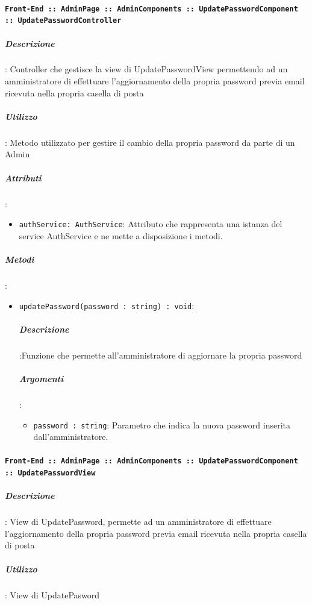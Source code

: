 \documentclass[../DefinizioneDiProdotto_v3.0.0.tex]{subfiles}
\begin{document}
				\paragraph{\texttt{Front-End :: AdminPage :: AdminComponents :: UpdatePasswordComponent :: UpdatePasswordController}}
					\subparagraph{Descrizione}: Controller che gestisce la view di UpdatePasswordView permettendo ad un amministratore di effettuare l'aggiornamento della propria password previa email ricevuta nella propria casella di posta
					\subparagraph{Utilizzo}: Metodo utilizzato per gestire il cambio della propria password da parte di un Admin
					\subparagraph{Attributi}:
					\begin{itemize}
						\item \texttt{authService: AuthService}: Attributo che rappresenta una istanza del service AuthService e ne mette a disposizione i metodi.
					\end{itemize}
					\subparagraph{Metodi}:
					\begin{itemize}
						\item \texttt{updatePassword(password : string) : void}:
						\subparagraph{Descrizione}:Funzione che permette all'amministratore di aggiornare la propria password
						\subparagraph{Argomenti}:
					  	\begin{itemize}
					  		\item \texttt{password : string}: Parametro che indica la nuova password inserita dall'amministratore.
					  	\end{itemize}
					\end{itemize}\vspace{0.5em}
				\paragraph{\texttt{Front-End :: AdminPage :: AdminComponents :: UpdatePasswordComponent :: UpdatePasswordView}}

		      		\subparagraph{Descrizione}: View di UpdatePassword, permette ad un amministratore di effettuare l'aggiornamento della propria password previa email ricevuta nella propria casella di posta
			      	\subparagraph{Utilizzo}: View di UpdatePasword


	\newpage
\end{document}
